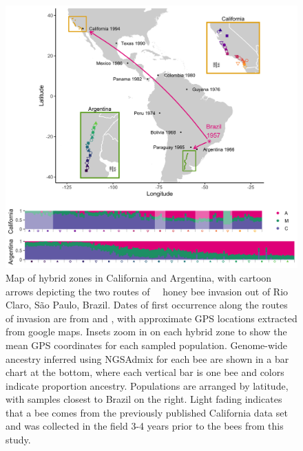\begin{figure}[p]
\includegraphics[width=.86\textwidth]{chapter1/figures/world_map_ngsadmix_tall.png}
\caption{ \textbf{} Map of hybrid zones in California and Argentina, with cartoon arrows depicting the two routes of \africanized\ \hyb\ honey bee invasion out of Rio Claro, São Paulo, Brazil. Dates of first occurrence along the routes of invasion are from \cite{WINSTON:1992vm} \cite{Kent:1988il} and \cite{USDA:2009}, with approximate GPS locations extracted from google maps. Insets zoom in on each hybrid zone to show the mean GPS coordinates for each sampled population.  Genome-wide  ancestry inferred using NGSAdmix for each bee are shown in a bar chart at the bottom, where each vertical bar is one bee and colors indicate proportion ancestry. Populations are arranged by latitude, with samples closest to Brazil on the right. Light fading indicates that a bee comes from the previously published California data set \cite{Cridland:2018fx} and was collected in the field 3-4 years prior to the bees from this study. }
\label{fig_map}
\end{figure}

